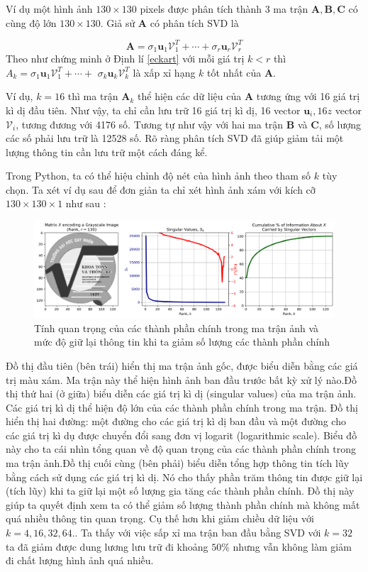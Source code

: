 \documentclass[12pt,a4paper,oneside]{report}
\numberwithin{equation}{section}
\begin{document}
Ví dụ một hình ảnh $130 \times 130$ pixels được phân tích thành 3 ma trận $\mathbf{A}, \mathbf{B}, \mathbf{C}$ có cùng độ lớn $130 \times 130$. Giả sử $\mathbf{A}$ có phân tích SVD là

$$
\mathbf{A}=\sigma_{1} \mathbf{u}_{1} \mathcal{V}_{1}^{T}+\cdots+\sigma_{r} \mathbf{u}_{r} \mathcal{V}_{r}^{T}
$$
Theo như chứng minh ở Định lí \ref{eckart} với mỗi giá trị $k<r$ thì $A_{k}=\sigma_{1} \mathbf{u}_{1} \mathcal{V}_{1}^{T}+\cdots+$ $\sigma_{k} \mathbf{u}_{k} \mathcal{V}_{k}^{T}$ là xấp xỉ hạng $k$ tốt nhất của $\mathbf{A}$.

Ví dụ, $k=16$ thì ma trận $\mathbf{A}_{k}$ thể hiện các dữ liệu của $\mathbf{A}$ tương ứng với 16 giá trị kì dị đầu tiên. Như vậy, ta chỉ cần lưu trữ 16 giá trị kì dị, 16 vector $\mathbf{u}_{i}, 16z $ vector $\mathcal{V}_{i}$, tương đương với 4176 số. Tương tự như vậy với hai ma trận $\mathbf{B}$ và $\mathbf{C}$, số lượng các số phải lưu trữ là 12528 số. Rõ ràng phân tích SVD đã giúp giảm tải một lượng thông tin cần lưu trữ một cách đáng kể.

Trong  Python, ta có thể hiệu chỉnh độ nét của hình ảnh theo tham số $k$ tùy chọn. Ta xét ví dụ sau để đơn giản ta chỉ xét hình ảnh xám với kích cỡ $130 \times 130 \times1 $ như sau :

\begin{figure}[htp]
	\centering
	\includegraphics[scale=0.5]{image-singular-values.png}
	\caption{Tính quan trọng của các thành phần chính trong ma trận ảnh và mức độ giữ lại thông tin khi ta giảm số lượng các thành phần chính}
	\label{fig:svd_sigular}
\end{figure}

Đồ thị đầu tiên (bên trái) hiển thị ma trận ảnh gốc, được biểu diễn bằng các giá trị màu xám. Ma trận này thể hiện hình ảnh ban đầu trước bất kỳ xử lý nào.Đồ thị thứ hai (ở giữa) biểu diễn các giá trị kì dị (singular values) của ma trận ảnh. Các giá trị kì dị thể hiện độ lớn của các thành phần chính trong ma trận. Đồ thị hiển thị hai đường: một đường cho các giá trị kì dị ban đầu và một đường cho các giá trị kì dụ được chuyển đổi sang đơn vị logarit (logarithmic scale). Biểu đồ này cho ta cái nhìn tổng quan về độ quan trọng của các thành phần chính trong ma trận ảnh.Đồ thị cuối cùng (bên phải) biểu diễn tổng hợp thông tin tích lũy bằng cách sử dụng các giá trị kì dị. Nó cho thấy phần trăm thông tin được giữ lại (tích lũy) khi ta giữ lại một số lượng gia tăng các thành phần chính. Đồ thị này giúp ta quyết định xem ta có thể giảm số lượng thành phần chính mà không mất quá nhiều thông tin quan trọng.
Cụ thế hơn khi giảm chiều dữ liệu với $k = 4,16, 32 ,64.$. Ta thấy với việc sấp xỉ ma trận ban đầu bằng SVD với $ k=32 $ ta đã giảm được dung lương lưu trữ đi khoảng $50\%$ nhưng vẫn không làm giảm đi chất lượng hình ảnh quá nhiều.
\end{document}

